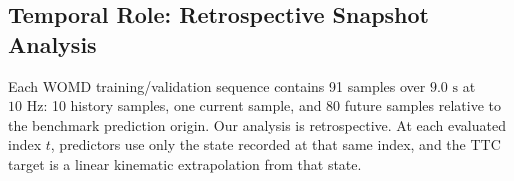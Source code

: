 \subsection{Temporal Role: Retrospective Snapshot Analysis}
Each WOMD training/validation sequence contains 91 samples over $9.0\text{ s}$ at $10\text{ Hz}$: 10 history samples, one current sample, and 80 future samples relative to the benchmark prediction origin. Our analysis is retrospective. At each evaluated index $t$, predictors use only the state recorded at that same index, and the TTC target is a linear kinematic extrapolation from that state.
